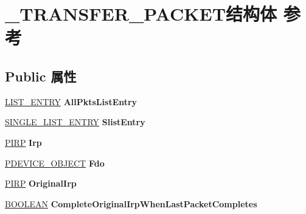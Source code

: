 \hypertarget{struct___t_r_a_n_s_f_e_r___p_a_c_k_e_t}{}\section{\+\_\+\+T\+R\+A\+N\+S\+F\+E\+R\+\_\+\+P\+A\+C\+K\+E\+T结构体 参考}
\label{struct___t_r_a_n_s_f_e_r___p_a_c_k_e_t}
\subsection*{Public 属性}
\begin{DoxyCompactItemize}
\item 
\mbox{\label{struct___t_r_a_n_s_f_e_r___p_a_c_k_e_t_af52d06b216273e918219893243b6b0fa}} 
\hyperlink{struct___l_i_s_t___e_n_t_r_y}{L\+I\+S\+T\+\_\+\+E\+N\+T\+RY} {\bfseries All\+Pkts\+List\+Entry}
\item 
\mbox{\label{struct___t_r_a_n_s_f_e_r___p_a_c_k_e_t_a9dcc27cd655c1e376db29018e3f28969}} 
\hyperlink{struct___s_i_n_g_l_e___l_i_s_t___e_n_t_r_y}{S\+I\+N\+G\+L\+E\+\_\+\+L\+I\+S\+T\+\_\+\+E\+N\+T\+RY} {\bfseries Slist\+Entry}
\item 
\mbox{\label{struct___t_r_a_n_s_f_e_r___p_a_c_k_e_t_aa7877ad252fa38764af3c311abbd0eaa}} 
\hyperlink{interfacevoid}{P\+I\+RP} {\bfseries Irp}
\item 
\mbox{\label{struct___t_r_a_n_s_f_e_r___p_a_c_k_e_t_aaac21086274210547263f7734b2438c6}} 
\hyperlink{struct___d_e_v_i_c_e___o_b_j_e_c_t}{P\+D\+E\+V\+I\+C\+E\+\_\+\+O\+B\+J\+E\+CT} {\bfseries Fdo}
\item 
\mbox{\label{struct___t_r_a_n_s_f_e_r___p_a_c_k_e_t_a7fbecba2f62dd5352905ccca0301445b}} 
\hyperlink{interfacevoid}{P\+I\+RP} {\bfseries Original\+Irp}
\item 
\mbox{\label{struct___t_r_a_n_s_f_e_r___p_a_c_k_e_t_a829825950d281c7ef67f3148d50f974a}} 
\hyperlink{_processor_bind_8h_a112e3146cb38b6ee95e64d85842e380a}{B\+O\+O\+L\+E\+AN} {\bfseries Complete\+Original\+Irp\+When\+Last\+Packet\+Completes}

\end{DoxyCompactItemize}
